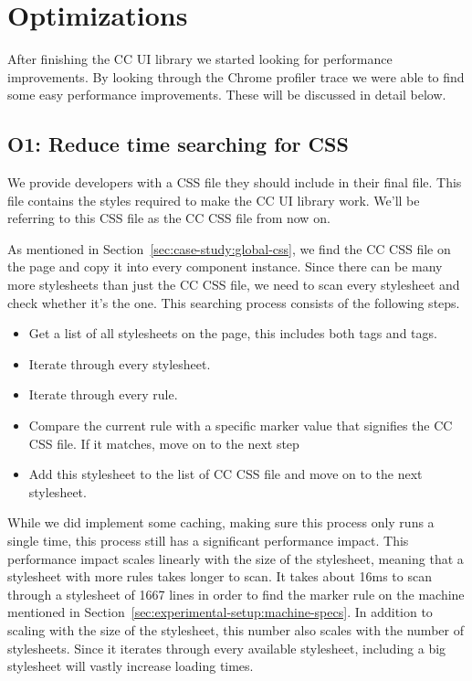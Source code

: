 \section{Optimizations}
After finishing the CC UI library we started looking for performance improvements. By looking through the Chrome profiler trace we were able to find some easy performance improvements. These will be discussed in detail below.

\subsection{O1: Reduce time searching for CSS}\label{sec:case-study:searching-for-css}
We provide developers with a CSS file they should include in their final  file. This file contains the styles required to make the CC UI library work. We'll be referring to this CSS file as the CC CSS file from now on.

As mentioned in Section~\ref{sec:case-study:global-css}, we find the CC CSS file on the page and copy it into every component instance. Since there can be many more stylesheets than just the CC CSS file, we need to scan every stylesheet and check whether it's the one. This searching process consists of the following steps.

\begin{itemize}
	\item Get a list of all stylesheets on the page, this includes both  tags and  tags.
	\item Iterate through every stylesheet.
	\item Iterate through every rule.
	\item Compare the current rule with a specific marker value that signifies the CC CSS file. If it matches, move on to the next step
	\item Add this stylesheet to the list of CC CSS file and move on to the next stylesheet.
\end{itemize}

While we did implement some caching, making sure this process only runs a single time, this process still has a significant performance impact. This performance impact scales linearly with the size of the stylesheet, meaning that a stylesheet with more rules takes longer to scan. It takes about 16ms to scan through a stylesheet of 1667 lines in order to find the marker rule on the machine mentioned in Section~\ref{sec:experimental-setup:machine-specs}. In addition to scaling with the size of the stylesheet, this number also scales with the number of stylesheets. Since it iterates through every available stylesheet, including a big stylesheet will vastly increase loading times.

